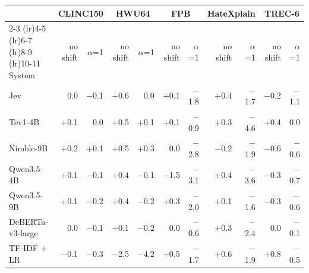 \begin{tabular}{lrrrrrrrrrr}
\toprule
 & \multicolumn{2}{c}{CLINC150} & \multicolumn{2}{c}{HWU64} & \multicolumn{2}{c}{FPB} & \multicolumn{2}{c}{HateXplain} & \multicolumn{2}{c}{TREC-6} \\
\cmidrule(lr){2-3} \cmidrule(lr){4-5} \cmidrule(lr){6-7} \cmidrule(lr){8-9} \cmidrule(lr){10-11}
System & no shift & $\alpha$=1 & no shift & $\alpha$=1 & no shift & $\alpha$=1 & no shift & $\alpha$=1 & no shift & $\alpha$=1 \\
\midrule
Jev & 0.0 & $-$0.1 & +0.6 & 0.0 & +0.1 & $-$1.8 & +0.4 & $-$1.7 & $-$0.2 & $-$1.1 \\
Tev1-4B & +0.1 & 0.0 & +0.5 & +0.1 & +0.1 & $-$0.9 & +0.3 & $-$4.6 & +0.4 & 0.0 \\
Nimble-9B & +0.2 & +0.1 & +0.5 & +0.3 & 0.0 & $-$2.8 & $-$0.2 & $-$1.9 & $-$0.6 & $-$0.6 \\
Qwen3.5-4B & +0.1 & $-$0.1 & +0.4 & $-$0.1 & $-$1.5 & $-$3.1 & +0.4 & $-$3.6 & $-$0.3 & $-$0.7 \\
Qwen3.5-9B & +0.1 & $-$0.2 & +0.4 & $-$0.2 & +0.3 & $-$2.0 & +0.1 & $-$1.6 & $-$0.3 & $-$0.6 \\
DeBERTa-v3-large & 0.0 & $-$0.1 & +0.1 & $-$0.2 & 0.0 & $-$0.6 & +0.3 & $-$2.4 & 0.0 & $-$0.1 \\
TF-IDF + LR & $-$0.1 & $-$0.3 & $-$2.5 & $-$4.2 & +0.5 & $-$1.7 & +0.6 & $-$1.9 & +0.8 & $-$0.5 \\
\bottomrule
\end{tabular}
